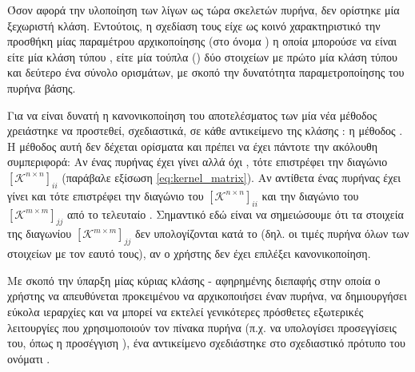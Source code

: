 Όσον αφορά την υλοποίηση των λίγων ως τώρα σκελετών πυρήνα, δεν ορίστηκε μία ξεχωριστή κλάση.
Εντούτοις, η σχεδίαση τους είχε ως κοινό χαρακτηριστικό την προσθήκη μίας παραμέτρου αρχικοποίησης (στο όνομα ) η οποία μπορούσε να είναι είτε μία κλάση τύπου , είτε μία τούπλα () δύο στοιχείων με πρώτο μία κλάση τύπου  και δεύτερο ένα σύνολο ορισμάτων, με σκοπό την δυνατότητα παραμετροποίησης του πυρήνα βάσης.\par
Για να είναι δυνατή η κανονικοποίηση του αποτελέσματος των  μία νέα μέθοδος χρειάστηκε να προστεθεί, σχεδιαστικά, σε κάθε αντικείμενο της κλάσης : η μέθοδος .
Η μέθοδος αυτή δεν δέχεται ορίσματα και πρέπει να έχει πάντοτε την ακόλουθη συμπεριφορά:
Αν ένας πυρήνας έχει γίνει  αλλά όχι , τότε επιστρέφει την διαγώνιο $[\mathcal{K}^{n\times n}]_{ii}$ (παράβαλε εξίσωση \ref{eq:kernel_matrix}).
Αν αντίθετα ένας πυρήνας έχει γίνει  και  τότε επιστρέφει την διαγώνιο του $[\mathcal{K}^{n\times n}]_{ii}$ και την διαγώνιο του $[\mathcal{K}^{m\times m}]_{jj}$ από το τελευταίο .
Σημαντικό εδώ είναι να σημειώσουμε ότι τα στοιχεία της διαγωνίου $[\mathcal{K}^{m\times m}]_{jj}$ δεν υπολογίζονται κατά το  (δηλ. οι τιμές πυρήνα όλων των στοιχείων με τον εαυτό τους), αν ο χρήστης δεν έχει επιλέξει κανονικοποίηση.\par
Με σκοπό την ύπαρξη μίας κύριας κλάσης - αφηρημένης διεπαφής στην οποία ο χρήστης να απευθύνεται προκειμένου να αρχικοποιήσει έναν πυρήνα, να δημιουργήσει εύκολα ιεραρχίες  και να μπορεί να εκτελεί γενικότερες πρόσθετες εξωτερικές λειτουργίες που χρησιμοποιούν τον πίνακα πυρήνα (π.χ. να υπολογίσει προσεγγίσεις του, όπως η προσέγγιση ), ένα αντικείμενο σχεδιάστηκε στο σχεδιαστικό πρότυπο του  ονόματι \texttt{}.
